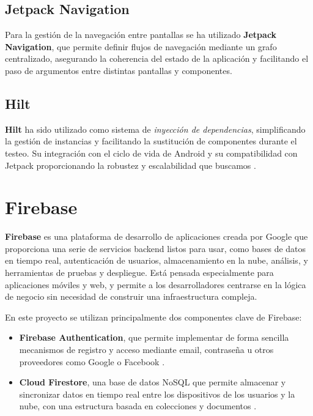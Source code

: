 \subsection{Jetpack Navigation}

Para la gestión de la navegación entre pantallas se ha utilizado \textbf{Jetpack Navigation}, que permite definir flujos de navegación mediante un grafo centralizado, asegurando la coherencia del estado de la aplicación y facilitando el paso de argumentos entre distintas pantallas y componentes.

\subsection{Hilt}

\textbf{Hilt} ha sido utilizado como sistema de \textit{inyección de dependencias}, simplificando la gestión de instancias y facilitando la sustitución de componentes durante el testeo. Su integración con el ciclo de vida de Android y su compatibilidad con Jetpack proporcionando la robustez y escalabilidad que buscamos \cite{hilt}.

\section{Firebase}

\textbf{Firebase} es una plataforma de desarrollo de aplicaciones creada por Google que proporciona una serie de servicios backend listos para usar, como bases de datos en tiempo real, autenticación de usuarios, almacenamiento en la nube, análisis, y herramientas de pruebas y despliegue. Está pensada especialmente para aplicaciones móviles y web, y permite a los desarrolladores centrarse en la lógica de negocio sin necesidad de construir una infraestructura compleja.

En este proyecto se utilizan principalmente dos componentes clave de Firebase:

\begin{itemize}
    \item \textbf{Firebase Authentication}, que permite implementar de forma sencilla mecanismos de registro y acceso mediante email, contraseña u otros proveedores como Google o Facebook \cite{firebase-auth}.

    \item \textbf{Cloud Firestore}, una base de datos NoSQL que permite almacenar y sincronizar datos en tiempo real entre los dispositivos de los usuarios y la nube, con una estructura basada en colecciones y documentos \cite{firestore}.
\end{itemize}

